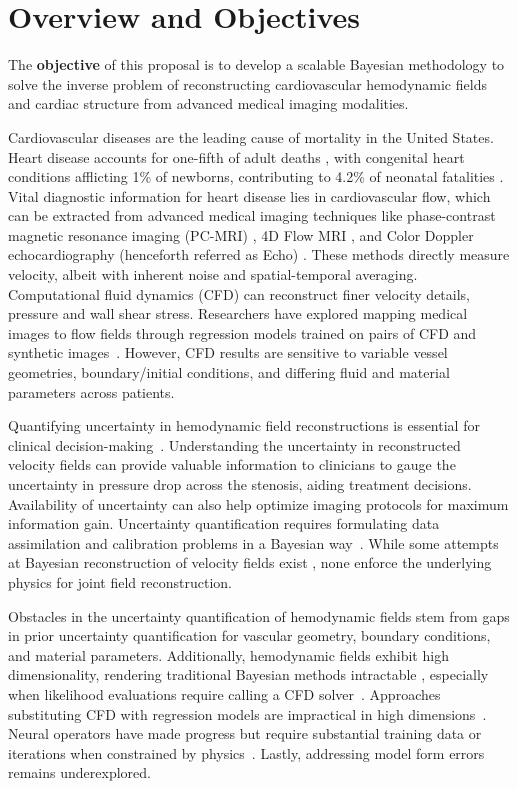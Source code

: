 \section{Overview and Objectives\label{sec:intro}}

The \textbf{objective} of this proposal is to develop a scalable Bayesian methodology to solve the inverse problem of reconstructing cardiovascular hemodynamic fields and cardiac structure from advanced medical imaging modalities.

Cardiovascular diseases are the leading cause of mortality in the United States.
Heart disease accounts for one-fifth of adult deaths \cite{heartstat}, with congenital heart conditions afflicting 1\% of newborns, contributing to 4.2\% of neonatal fatalities \cite{CHDstat1, petrini2010racial}.
Vital diagnostic information for heart disease lies in cardiovascular flow, which can be extracted from advanced medical imaging techniques like phase-contrast magnetic resonance imaging (PC-MRI) \cite{Nayak2015_PCMRI}, 4D Flow MRI \cite{maroun2023_4D}, and Color Doppler echocardiography (henceforth referred as Echo) \cite{brett2020_echo}.
These methods directly measure velocity, albeit with inherent noise and spatial-temporal averaging.
Computational fluid dynamics (CFD) \cite{morris2016_CFD} can reconstruct finer velocity details, pressure and wall shear stress.
Researchers have explored mapping medical images to flow fields through regression models trained on pairs of CFD and synthetic images~\cite{Ferdien2020_4DFlowNN,Rutkowski2021_4DFlowNN}.
However, CFD results are sensitive to variable vessel geometries, boundary/initial conditions, and differing fluid and material parameters across patients.

Quantifying uncertainty in hemodynamic field reconstructions is essential for clinical decision-making~\cite{Ninos2018_HemoUQ}. 
Understanding the uncertainty in reconstructed velocity fields can provide valuable information to clinicians to gauge the uncertainty in pressure drop across the stenosis, aiding treatment decisions.
Availability of uncertainty can also help optimize imaging protocols for maximum information gain.
Uncertainty quantification requires formulating data assimilation and calibration problems in a Bayesian way~\cite{Arzani2022_CardioML}.
While some attempts at Bayesian reconstruction of velocity fields exist \cite{Nguyen2022_HemoBayes, croci2021fast}, none enforce the underlying physics for joint field reconstruction.

Obstacles in the uncertainty quantification of hemodynamic fields stem from gaps in prior uncertainty quantification for vascular geometry, boundary conditions, and material parameters. 
Additionally, hemodynamic fields exhibit high dimensionality, rendering traditional Bayesian methods intractable \cite{gao2010composite}, especially when likelihood evaluations require calling a CFD solver~\cite{liu2021uncertainty}.
Approaches substituting CFD with regression models are impractical in high dimensions~\cite{Arzani2022_CardioML}.
Neural operators have made progress but require substantial training data or iterations when constrained by physics~\cite{li2020fourier, maul2023transient}.
Lastly, addressing model form errors remains underexplored.

